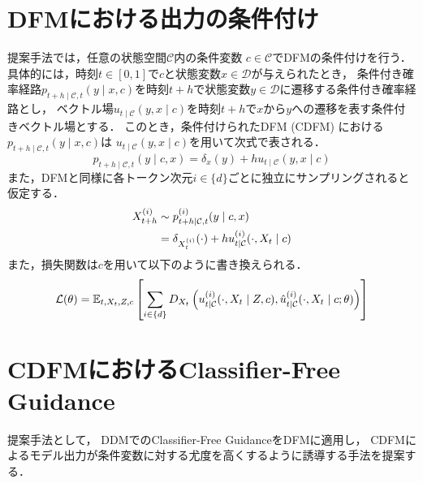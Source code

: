 \documentclass[11pt]{jsarticle}  %
\begin{document}
\section{DFMにおける出力の条件付け}
\label{sec:cdfm}
提案手法では，任意の状態空間$\mathcal{C}$内の条件変数 $c \in \mathcal{C}$でDFMの条件付けを行う．
具体的には，時刻$t \in [0, 1]$で$c$と状態変数$x \in \mathcal{D}$が与えられたとき，
条件付き確率経路$p_{t+h \mid \mathcal{C}, t}(y \mid x, c)$を時刻$t+h$で状態変数$y \in \mathcal{D}$に遷移する条件付き確率経路とし，
ベクトル場$u_{t \mid \mathcal{C}}(y, x \mid c)$を時刻$t+h$で$x$から$y$への遷移を表す条件付きベクトル場とする．
このとき，条件付けられたDFM (CDFM) における$p_{t+h \mid \mathcal{C}, t}(y \mid x, c)$は
$u_{t \mid \mathcal{C}}(y, x \mid c)$を用いて次式で表される．
\begin{equation}
  \label{eq:dfm_transition_porb_cond}
  p_{t+h \mid \mathcal{C}, t}(y \mid c, x) = \delta_x(y) + h u_{t \mid \mathcal{C}}(y, x \mid c)
\end{equation}
また，DFMと同様に各トークン次元$i \in \{d\}$ごとに独立にサンプリングされると仮定する．
\begin{align}
  X_{t+h}^{(i)} &\sim p_{t+h \mid \mathcal{C}, t}^{(i)}(y \mid c, x) \notag \\
    &= \delta_{X_t^{(i)}}(\cdot) + h u_{t \mid \mathcal{C}}^{(i)}(\cdot, X_t \mid c) \notag
\end{align}
また，損失関数は$c$を用いて以下のように書き換えられる．
\begin{equation}
  \mathcal{L}(\theta) = 
    \mathbb{E}_{t, X_t, Z, c}\left[ \sum_{i \in \{d\}}
      D_{X_t}\left(
        u_{t \mid \mathcal{C}}^{(i)}(\cdot, X_t \mid Z, c) , 
        \hat{u}_{t \mid \mathcal{C}}^{(i)}(\cdot, X_t \mid c; \theta)\right)\right] \notag
\end{equation}


\section{CDFMにおけるClassifier-Free Guidance}
提案手法として，
DDMでのClassifier-Free GuidanceをDFMに適用し，
CDFMによるモデル出力が条件変数に対する尤度を高くするように誘導する手法を提案する．

\end{document}
